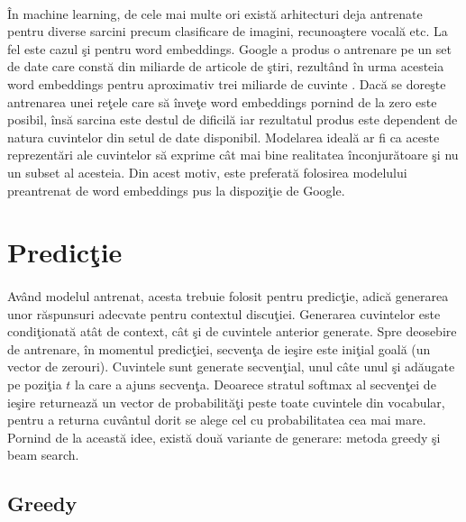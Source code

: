 \paragraph{}
\^ In machine learning, de cele mai multe ori exist\u a arhitecturi deja antrenate pentru diverse sarcini precum clasificare de imagini, recunoa\c stere vocal\u a etc. La fel este cazul \c si pentru word embeddings. Google a produs o antrenare pe un set de date care const\u a din miliarde de articole de \c stiri, rezult\^ and \^ in urma acesteia word embeddings pentru aproximativ trei miliarde de cuvinte \cite{word2vec}. Dac\u a se dore\c ste antrenarea unei re\c tele care s\u a \^ inve\c te word embeddings pornind de la zero este posibil, \^ ins\u a sarcina este destul de dificil\u a iar rezultatul produs este dependent de natura cuvintelor din setul de date disponibil. Modelarea ideal\u a ar fi ca aceste reprezent\u ari ale cuvintelor s\u a exprime c\^ at mai bine realitatea \^ inconjur\u atoare \c si nu un subset al acesteia. Din acest motiv, este preferat\u a folosirea modelului preantrenat de word embeddings pus la dispozi\c tie de Google.

\section{Predic\c tie}

\paragraph{}
Av\^ and modelul antrenat, acesta trebuie folosit pentru predic\c tie, adic\u a generarea unor r\u aspunsuri adecvate pentru contextul discu\c tiei. Generarea cuvintelor este condi\c tionat\u a at\^ at de context, c\^ at \c si de cuvintele anterior generate. Spre deosebire de antrenare, \^ in momentul predic\c tiei, secven\c ta de ie\c sire este ini\c tial goal\u a (un vector de zerouri). Cuvintele sunt generate secven\c tial, unul c\^ ate unul \c si ad\u augate pe pozi\c tia \(t\) la care a ajuns secven\c ta. Deoarece stratul softmax al secven\c tei de ie\c sire returneaz\u a un vector de probabilit\u a\c ti peste toate cuvintele din vocabular, pentru a returna cuv\^ antul dorit se alege cel cu probabilitatea cea mai mare. Pornind de la aceast\u a idee, exist\u a dou\u a variante de generare: metoda greedy \c si beam search.

\subsection{Greedy}

